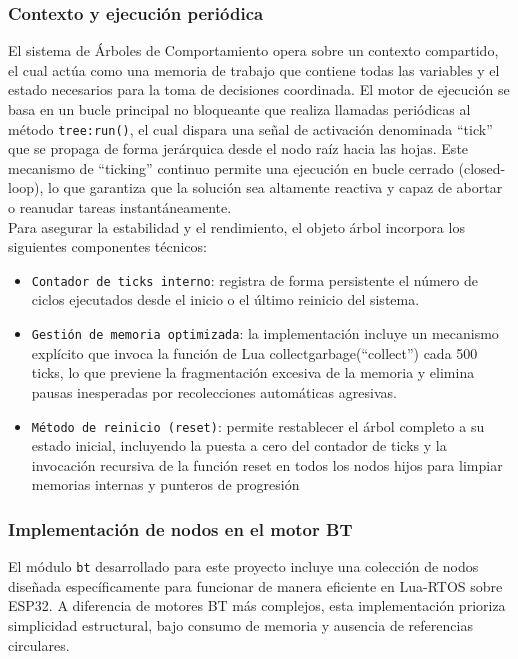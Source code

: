 \documentclass{prgrado}
\begin{document}
\subsubsection{Contexto y ejecución periódica}

El sistema de Árboles de Comportamiento opera sobre un contexto compartido, el cual actúa como una memoria de trabajo que contiene todas las variables y el estado necesarios para la toma de decisiones coordinada. El motor de ejecución se basa en un bucle principal no bloqueante que realiza llamadas periódicas al método \texttt{tree:run()}, el cual dispara una señal de activación denominada ``tick'' que se propaga de forma jerárquica desde el nodo raíz hacia las hojas. Este mecanismo de ``ticking'' continuo permite una ejecución en bucle cerrado (closed-loop), lo que garantiza que la solución sea altamente reactiva y capaz de abortar o reanudar tareas instantáneamente.\\

Para asegurar la estabilidad y el rendimiento, el objeto árbol incorpora los siguientes componentes técnicos:

\begin{itemize}
    \item \texttt{Contador de ticks interno}: registra de forma persistente el número de ciclos ejecutados desde el inicio o el último reinicio del sistema.
    \item \texttt{Gestión de memoria optimizada}: la implementación incluye un mecanismo explícito que invoca la función de Lua collectgarbage(``collect'') cada 500 ticks, lo que previene la fragmentación excesiva de la memoria y elimina pausas inesperadas por recolecciones automáticas agresivas.
    \item \texttt{Método de reinicio (reset)}: permite restablecer el árbol completo a su estado inicial, incluyendo la puesta a cero del contador de ticks y la invocación recursiva de la función reset en todos los nodos hijos para limpiar memorias internas y punteros de progresión
\end{itemize}

\subsubsection{Implementación de nodos en el motor BT}

El módulo \texttt{bt} desarrollado para este proyecto incluye una colección de nodos diseñada específicamente para funcionar de manera eficiente en Lua-RTOS sobre ESP32. A diferencia de motores BT más complejos, esta implementación prioriza simplicidad estructural, bajo consumo de memoria y ausencia de referencias circulares.
\end{document}
